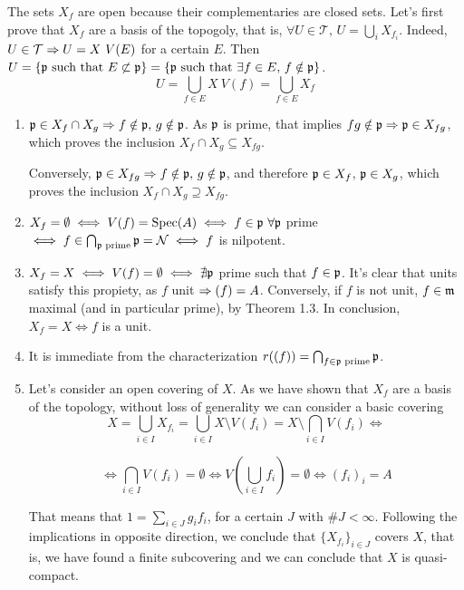 \begin{sol}
	The sets $X_f$ are open because their complementaries are closed sets. Let's first prove that $X_f$ are a basis of the topogoly, that is, $\forall U \in \mathcal{T}, \, U = \bigcup_i X_{f_i}$. Indeed, $U \in \mathcal{T} \imp U = X \ V(E)$ for a certain $E$. Then $U = \{ \mathfrak{p} \text{ such that } E \not \subset \mathfrak{p} \} = \{\mathfrak{p} \text{ such that } \exists f \in E, \, f \notin \mathfrak{p} \}$.
	\[
		U = \bigcup_{f \in E} X \ V(f) = \bigcup_{f \in E} X_f
	\]

	\begin{enumerate}[label=(\roman*)]
		\item $\mathfrak{p} \in X_f \cap X_g \Rightarrow f \notin \mathfrak{p}, \, g \notin \mathfrak{p}$. As $\mathfrak{p}$ is prime, that implies $fg \notin \mathfrak{p} \Rightarrow \mathfrak{p} \in X_{fg}$, which proves the inclusion $X_f \cap X_g \subseteq X_{fg}$.

		Conversely, $\mathfrak{p} \in X_{fg} \Rightarrow f \notin \mathfrak{p}, \, g \notin \mathfrak{p}$, and therefore $\mathfrak{p} \in X_f$, $\mathfrak{p} \in X_g$, which proves the inclusion $X_f \cap X_g \supseteq X_{fg}$.

		\item $X_f = \emptyset \iff V(f) = \text{Spec}(A) \iff f \in \mathfrak{p} \, \, \forall \mathfrak{p}$ prime $\iff f \in \bigcap_{\mathfrak{p} \text{ prime}} \mathfrak{p} = \mathcal{N} \iff f$ is nilpotent.

		\item $X_f = X \iff V(f) = \emptyset \iff \nexists \mathfrak{p}$ prime such that $f \in \mathfrak{p}$. It's clear that units satisfy this propiety, as $f$ unit $\Rightarrow (f) = A$. Conversely, if $f$ is not unit, $f \in \mathfrak{m}$ maximal (and in particular prime), by Theorem 1.3. In conclusion, $X_f = X \iff f$ is a unit.

		\item It is immediate from the characterization $r((f)) = \bigcap_{f \in \mathfrak{p} \text{ prime}} \mathfrak{p}$. 

		\item Let's consider an open covering of $X$. As we have shown that $X_f$ are a basis of the topology, without loss of generality we can consider a basic covering
		\[
			X = \bigcup_{i \in I} X_{f_i} =  \bigcup_{i \in I} X \setminus V(f_i) = X \setminus \bigcap_{i \in I} V(f_i) \iff
		\]

		\[
			\iff \bigcap_{i \in I} V(f_i) = \emptyset \iff V(\bigcup_{i \in I} f_i) = \emptyset \iff (f_i)_i = A
		\]

		That means that $1 = \sum_{i \in J} g_i f_i$, for a certain $J$ with $\#J < \infty$. Following the implications in opposite direction, we conclude that $\{ X_{f_i} \}_{i \in J}$ covers $X$, that is, we have found a finite subcovering and we can conclude that $X$ is quasi-compact.


\end{enumerate}
\end{sol}
